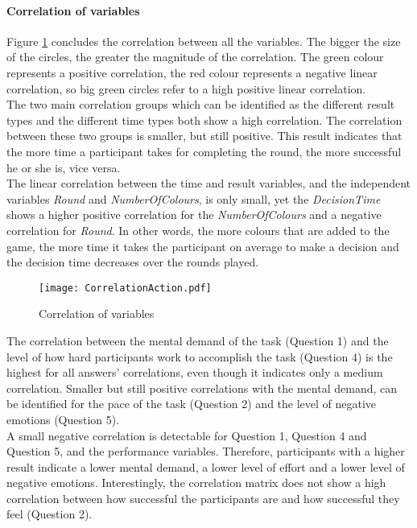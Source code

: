 \paragraph{Correlation of variables}
Figure \ref{Correlation} concludes the correlation between all the variables. The bigger the size of the circles, the greater the magnitude of the correlation. The green colour represents a positive correlation, the red colour represents a negative linear correlation, so big green circles refer to a high positive linear correlation.\\
The two main correlation groups which can be identified as the different result types and the different time types both show a high correlation. The correlation between these two groups is smaller, but still positive. This result indicates that the more time a participant takes for completing the round, the more successful he or she is, vice versa.\\
The linear correlation between the time and result variables, and the independent variables \textit{Round} and \textit{NumberOfColours}, is only small, yet the \textit{DecisionTime} shows a higher positive correlation for the \textit{NumberOfColours} and a negative correlation for \textit{Round}. In other words, the more colours that are added to the game, the more time it takes the participant on average to make a decision and the decision time decreases over the rounds played.\\

 \begin{figure}[htbp] %
\begin{center} %
  \texttt{[image: CorrelationAction.pdf]}
  \caption{Correlation of variables}
  \label{Correlation}
\end{center}
\end{figure}

The correlation between the mental demand of the task (Question 1) and the level of how hard participants work to accomplish the task (Question 4) is the highest for all answers' correlations, even though it indicates only a medium correlation. Smaller but still positive correlations with the mental demand, can be identified for the pace of the task (Question 2) and the level of negative emotions (Question 5).\\
A small negative correlation is detectable for Question 1, Question 4 and Question 5, and the performance variables. Therefore, participants with a higher result indicate a lower mental demand, a lower level of effort and a lower level of negative emotions. Interestingly, the correlation matrix does not show a high correlation between how successful the participants are and how successful they feel (Question 2). 
